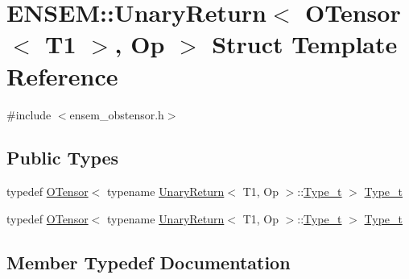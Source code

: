\hypertarget{structENSEM_1_1UnaryReturn_3_01OTensor_3_01T1_01_4_00_01Op_01_4}{}\section{E\+N\+S\+EM\+:\+:Unary\+Return$<$ O\+Tensor$<$ T1 $>$, Op $>$ Struct Template Reference}
\label{structENSEM_1_1UnaryReturn_3_01OTensor_3_01T1_01_4_00_01Op_01_4}


{\ttfamily \#include $<$ensem\+\_\+obstensor.\+h$>$}

\subsection*{Public Types}
\begin{DoxyCompactItemize}
\item 
typedef \mbox{\hyperlink{classENSEM_1_1OTensor}{O\+Tensor}}$<$ typename \mbox{\hyperlink{structENSEM_1_1UnaryReturn}{Unary\+Return}}$<$ T1, Op $>$\+::\mbox{\hyperlink{structENSEM_1_1UnaryReturn_3_01OTensor_3_01T1_01_4_00_01Op_01_4_a2896ac85d983d41194d2482e3b851bb0}{Type\+\_\+t}} $>$ \mbox{\hyperlink{structENSEM_1_1UnaryReturn_3_01OTensor_3_01T1_01_4_00_01Op_01_4_a2896ac85d983d41194d2482e3b851bb0}{Type\+\_\+t}}
\item 
typedef \mbox{\hyperlink{classENSEM_1_1OTensor}{O\+Tensor}}$<$ typename \mbox{\hyperlink{structENSEM_1_1UnaryReturn}{Unary\+Return}}$<$ T1, Op $>$\+::\mbox{\hyperlink{structENSEM_1_1UnaryReturn_3_01OTensor_3_01T1_01_4_00_01Op_01_4_a2896ac85d983d41194d2482e3b851bb0}{Type\+\_\+t}} $>$ \mbox{\hyperlink{structENSEM_1_1UnaryReturn_3_01OTensor_3_01T1_01_4_00_01Op_01_4_a2896ac85d983d41194d2482e3b851bb0}{Type\+\_\+t}}
\end{DoxyCompactItemize}


\subsection{Member Typedef Documentation}
\mbox{\label{structENSEM_1_1UnaryReturn_3_01OTensor_3_01T1_01_4_00_01Op_01_4_a2896ac85d983d41194d2482e3b851bb0}} 
